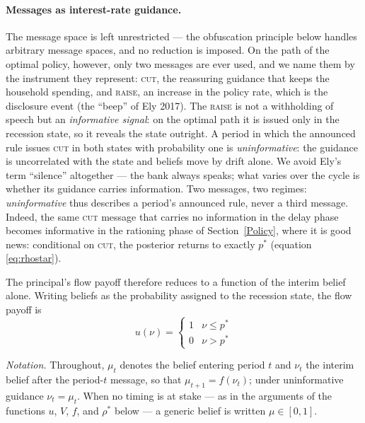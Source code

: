 \documentclass[12pt]{article}
\begin{document}
\paragraph{Messages as interest-rate guidance.} The message space is left unrestricted --- the obfuscation principle below handles arbitrary message spaces, and no reduction is imposed. On the path of the optimal policy, however, only two messages are ever used, and we name them by the instrument they represent: \textsc{cut}, the reassuring guidance that keeps the household spending, and \textsc{raise}, an increase in the policy rate, which is the disclosure event (the ``beep'' of Ely 2017). The \textsc{raise} is not a withholding of speech but an \emph{informative signal}: on the optimal path it is issued only in the recession state, so it reveals the state outright. A period in which the announced rule issues \textsc{cut} in both states with probability one is \emph{uninformative}: the guidance is uncorrelated with the state and beliefs move by drift alone. We avoid Ely's term ``silence'' altogether --- the bank always speaks; what varies over the cycle is whether its guidance carries information. Two messages, two regimes: \emph{uninformative} thus describes a period's announced rule, never a third message. Indeed, the same \textsc{cut} message that carries no information in the delay phase becomes informative in the rationing phase of Section~\ref{Policy}, where it is good news: conditional on \textsc{cut}, the posterior returns to exactly $p^*$ (equation \eqref{eq:rhostar}).

The principal's flow payoff therefore reduces to a function of the interim belief alone. Writing beliefs as the probability assigned to the recession state, the flow payoff is
\[
u(\nu)=
\begin{cases}
1 & \nu \le p^* \\
0 & \nu > p^*
\end{cases}
\]

\noindent\emph{Notation.} Throughout, $\mu_t$ denotes the belief entering period $t$ and $\nu_t$ the interim belief after the period-$t$ message, so that $\mu_{t+1}=f(\nu_t)$; under uninformative guidance $\nu_t=\mu_t$. When no timing is at stake --- as in the arguments of the functions $u$, $V$, $f$, and $\rho^*$ below --- a generic belief is written $\mu\in[0,1]$.
\end{document}
